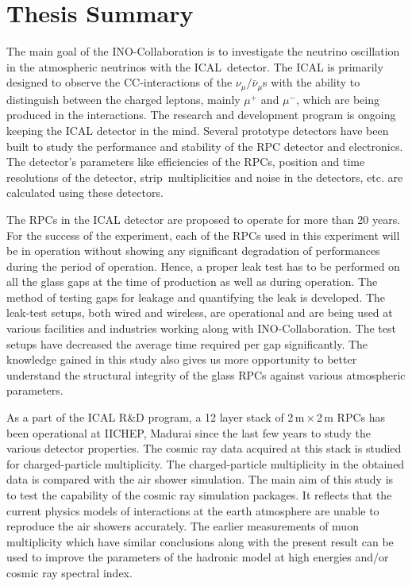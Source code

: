 
\chapter{Thesis Summary}

The main goal of the INO-Collaboration is to investigate the neutrino
oscillation in the atmospheric neutrinos with the ICAL~detector.
The ICAL is primarily designed to observe the CC-interactions of
the $\nu_{\mu}/\bar{\nu}_{\mu}$s with the ability to distinguish between
the charged leptons, mainly $\mu^{+}$ and $\mu^{-}$,
which are being produced in the interactions. The research and
development program is ongoing keeping the ICAL detector in the mind.
Several prototype detectors have been built to study the performance
and stability of the RPC detector and electronics. The detector's
parameters like efficiencies of the RPCs, position and time
resolutions of the detector, strip~multiplicities and noise
in the detectors, etc. are calculated using these detectors.

The RPCs in the ICAL detector are proposed to operate for more than 20
years. For the success of the experiment, each of the RPCs used in
this experiment will be in operation without showing any significant
degradation of performances during the period of operation. Hence, a
proper leak test has to be performed on all the glass gaps at the time
of production as well as during operation.
The method of testing gaps for leakage and quantifying the leak is
developed. The leak-test setups, both wired and wireless, are
operational and are being used at various facilities and industries
working along with INO-Collaboration. The test setups have decreased
the average time required per gap significantly. The knowledge gained
in this study also gives us more opportunity to better understand the
structural integrity of the glass RPCs against various atmospheric
parameters.

As a part of the ICAL R\&D program, a 12 layer stack of
2\,m\,$\times$\,2\,m RPCs has been operational at IICHEP, Madurai
since the last few years to study the various detector properties. The
cosmic ray data acquired at this stack is studied for charged-particle
multiplicity. The charged-particle multiplicity in the obtained data
is compared with the air shower simulation. The main aim of this study
is to test the capability of the cosmic ray simulation packages. It
reflects that the current physics models of interactions at the earth
atmosphere are unable to reproduce the air showers accurately. The
earlier measurements of muon multiplicity which have similar
conclusions along with the present result can be used to improve the
parameters of the hadronic model at high energies and/or cosmic ray
spectral index.

